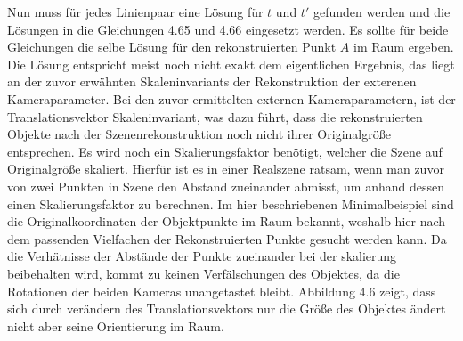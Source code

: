 Nun muss für jedes Linienpaar eine Lösung für $t$ und $t'$ gefunden werden und die Lösungen in die Gleichungen 4.65 und 4.66 eingesetzt werden. Es sollte für beide Gleichungen die selbe Lösung für den rekonstruierten Punkt $A$ im Raum ergeben. Die Lösung entspricht meist noch nicht exakt dem eigentlichen Ergebnis, das liegt an der zuvor erwähnten Skaleninvariants der Rekonstruktion der exterenen Kameraparameter. Bei den zuvor ermittelten externen Kameraparametern, ist der Translationsvektor Skaleninvariant, was dazu führt, dass die rekonstruierten Objekte nach der Szenenrekonstruktion noch nicht ihrer Originalgröße entsprechen. Es wird noch ein Skalierungsfaktor benötigt, welcher die Szene auf Originalgröße skaliert. Hierfür ist es in einer Realszene ratsam, wenn man zuvor von zwei Punkten in Szene den Abstand zueinander abmisst, um anhand dessen einen Skalierungsfaktor zu berechnen. Im hier beschriebenen Minimalbeispiel sind die Originalkoordinaten der Objektpunkte im Raum bekannt, weshalb hier nach dem passenden Vielfachen der Rekonstruierten Punkte gesucht werden kann. Da die Verhätnisse der Abstände der Punkte zueinander bei der skalierung beibehalten wird, kommt zu keinen Verfälschungen des Objektes, da die Rotationen der beiden Kameras unangetastet bleibt. Abbildung 4.6 zeigt, dass sich durch verändern des Translationsvektors nur die Größe des Objektes ändert nicht aber seine Orientierung im Raum.

